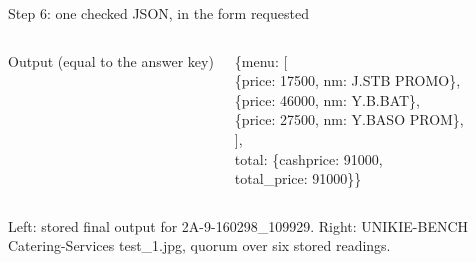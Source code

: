 \documentclass[aspectratio=169,10pt]{beamer}
\newcommand{\src}[1]{\par\vfill{\tiny\color{muted}#1\par}}
\begin{document}
\begin{frame}{Step 6: one checked JSON, in the form requested}
\begin{columns}[T]
\begin{columns}[T]
{\tiny\color{muted} Output (equal to the answer key)}\\
{\tiny\ttfamily\raggedright \{\textquotedbl{}menu\textquotedbl{}: [\\\hspace*{1.56em}\{\textquotedbl{}price\textquotedbl{}: \textquotedbl{}17500\textquotedbl{}, \textquotedbl{}nm\textquotedbl{}: \textquotedbl{}J.STB PROMO\textquotedbl{}\},\\\hspace*{1.56em}\{\textquotedbl{}price\textquotedbl{}: \textquotedbl{}46000\textquotedbl{}, \textquotedbl{}nm\textquotedbl{}: \textquotedbl{}Y.B.BAT\textquotedbl{}\},\\\hspace*{1.56em}\{\textquotedbl{}price\textquotedbl{}: \textquotedbl{}27500\textquotedbl{}, \textquotedbl{}nm\textquotedbl{}: \textquotedbl{}Y.BASO PROM\textquotedbl{}\},\\\hspace*{0.52em}],\\\hspace*{0.52em}\textquotedbl{}total\textquotedbl{}: \{\textquotedbl{}cashprice\textquotedbl{}: \textquotedbl{}91000\textquotedbl{},\\\hspace*{5.72em}\textquotedbl{}total\_price\textquotedbl{}: \textquotedbl{}91000\textquotedbl{}\}\}\par}
\end{columns}
\end{columns}
\src{Left: stored final output for 2A-9-160298\_109929. Right: UNIKIE-BENCH Catering-Services test\_1.jpg, quorum over six stored readings.}
\end{frame}
\end{document}
